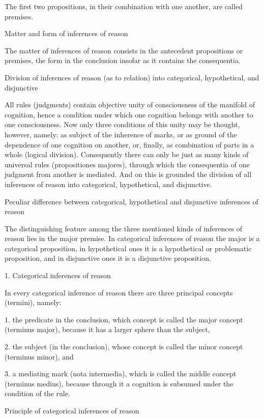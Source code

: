 The first two propositions, in their combination with one another,
are called premises.

Matter and form of inferences of reason

The matter of inferences of reason consists in
the antecedent propositions or premises,
the form in the conclusion insofar as it contains the consequentia.

Division of inferences of reason (as to relation)
into categorical, hypothetical, and disjunctive

All rules (judgments) contain objective unity of
consciousness of the manifold of cognition,
hence a condition under which one cognition
belongs with another to one consciousness.
Now only three conditions of this unity may be thought, however, namely:
as subject of the inherence of marks, or
as ground of the dependence of one cognition on another, or, finally,
as combination of parts in a whole (logical division).
Consequently there can only be just as many
kinds of universal rules (propositiones majores),
through which the consequentia of one judgment
from another is mediated.
And on this is grounded the division of
all inferences of reason into
categorical, hypothetical, and disjunctive.

Peculiar difference between categorical, hypothetical and disjunctive
inferences of reason

The distinguishing feature among the three mentioned
kinds of inferences of reason lies in the major premise.
In categorical inferences of reason the major is a categorical proposition,
in hypothetical ones it is a hypothetical or problematic proposition,
and in disjunctive ones it is a disjunctive proposition.

1. Categorical inferences of reason

In every categorical inference of reason there are
three principal concepts (termini), namely:

1.  the predicate in the conclusion,
    which concept is called the major concept (terminus major),
    because it has a larger sphere than the subject,

2.  the subject (in the conclusion),
    whose concept is called the minor concept (terminus minor), and

3.  a mediating mark (nota intermedia),
    which is called the middle concept (terminus medius),
    because through it a cognition is subsumed under
    the condition of the rule.

Principle of categorical inferences of reason

